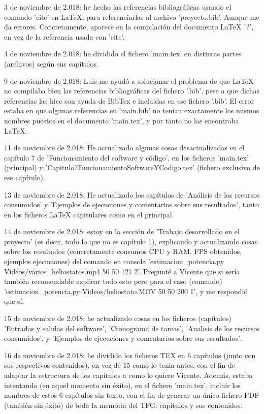 3 de noviembre de 2.018: he hecho las referencias bibliográficas usando el comando 'cite' en LaTeX, para referenciarlas al archivo 'proyecto.bib'. Aunque me da errores. Concretamente, aparece en la compilación del documento LaTeX '?', en vez de la referencia usada con 'cite'.

4 de noviembre de 2.018: he dividido el fichero 'main.tex' en distintas partes (archivos) según sus capítulos.

9 de noviembre de 2.018: Luis me ayudó a solucionar el problema de que LaTeX no compilaba bien las referencias bibliográficas del fichero '.bib', pese a que dichas referencias las hice con ayuda de BibTex e incluidas en ese fichero '.bib'. El error estaba en que algunas referencias en 'main.bib' no tenían exactamente los mismos nombres puestos en el documento 'main.tex', y por tanto no las encontraba LaTeX.

11 de noviembre de 2.018: He actualizado algunas cosas desactualizadas en el capítulo 7 de 'Funcionamiento del software y código', en los ficheros 'main.tex' (principal) y 'Capitulo7FuncionamientoSoftwareYCodigo.tex' (fichero exclusivo de ese capítulo).

13 de noviembre de 2.018: He actualizado los capítulos de 'Análisis de los recursos consumidos' y 'Ejemplos de ejecuciones y comentarios sobre sus resultados', tanto en los ficheros LaTeX capitulares como en el principal.

14 de noviembre de 2.018: estoy en la sección de 'Trabajo desarrollado en el proyecto' (es decir, todo lo que no es capítulo 1), explicando y actualizando cosas sobre los resultados (concretamente consumos CPU y RAM, FPS obtenidos, ejemplos ejecuciones) del comando en consola 'estimacion\_potencia.py Videos/varios\_heliostatos.mp4 50 50 127 2'. Pregunté a Vicente que si sería también recomendable explicar todo esto pero para el caso (comando) 'estimacion\_potencia.py Videos/heliostato.MOV 50 50 200 1', y me respondió que sí.

15 de noviembre de 2.018: he actualizado cosas en los ficheros (capítulos) 'Entradas y salidas del software', 'Cronograma de tareas', 'Analisis de los recursos consumidos', y 'Ejemplos de ejecuciones y comentarios sobre sus resultados'.

16 de noviembre de 2.018: he dividido los ficheros TEX en 6 capítulos (junto con sus respectivos contenidos), en vez de 15 como lo tenia antes, con el fin de adaptar la estructura de los capítulos a como lo quiere Vicente. Además, estaba intentando (en aquel momento sin éxito), en el fichero 'main.tex', incluir los nombres de estos 6 capítulos sin texto, con el fin de generar un único fichero PDF (también sin éxito) de toda la memoria del TFG: capítulos y sus contenidos.

